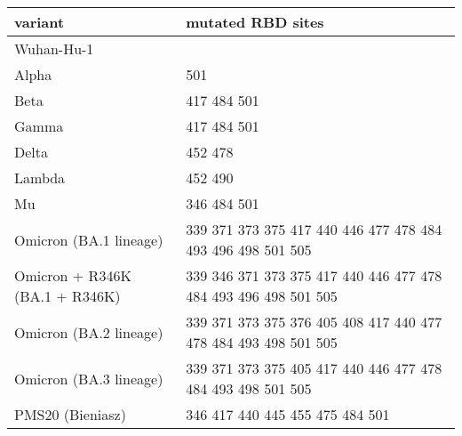 \begin{tabular}{ll}
\toprule
                       variant &                                               mutated RBD sites \\
\midrule
                    Wuhan-Hu-1 &                                                                 \\
                         Alpha &                                                             501 \\
                          Beta &                                                     417 484 501 \\
                         Gamma &                                                     417 484 501 \\
                         Delta &                                                         452 478 \\
                        Lambda &                                                         452 490 \\
                            Mu &                                                     346 484 501 \\
        Omicron (BA.1 lineage) &     339 371 373 375 417 440 446 477 478 484 493 496 498 501 505 \\
Omicron + R346K (BA.1 + R346K) & 339 346 371 373 375 417 440 446 477 478 484 493 496 498 501 505 \\
        Omicron (BA.2 lineage) & 339 371 373 375 376 405 408 417 440 477 478 484 493 498 501 505 \\
        Omicron (BA.3 lineage) &     339 371 373 375 405 417 440 446 477 478 484 493 498 501 505 \\
              PMS20 (Bieniasz) &                                 346 417 440 445 455 475 484 501 \\
\bottomrule
\end{tabular}
